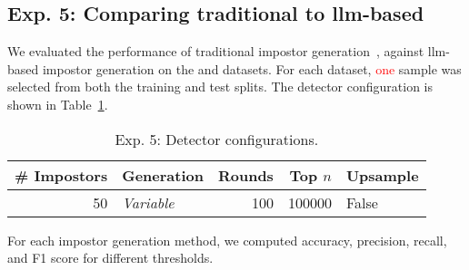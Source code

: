 \subsection{Exp. 5: Comparing traditional to \ac{llm}-based \imps{}}
\label{subsec:imp_gen}

We evaluated the performance of traditional impostor generation~\citep{koppel_determining_2014}, against \ac{llm}-based impostor generation on the \dataBlog{} and \dataStudent{} datasets. 
For each dataset, \textcolor{red}{one} sample was selected from both the training and test splits. 
The detector configuration is shown in Table~\ref{tab:imp_gen_comp}.

\begin{table}[h]
\centering\small
\caption{Exp. 5: Detector configurations.}
\label{tab:imp_gen_comp}
\begin{tabular}{@{}rlrrl@{}}   %
\toprule
\# Impostors & Generation & Rounds & Top $n$ & Upsample \\
\midrule
50 & \textit{Variable} & 100 & \num{100000} & False \\
\bottomrule
\end{tabular}%
\end{table}

For each impostor generation method, we computed accuracy, precision, recall, and F1 score for different thresholds. 
